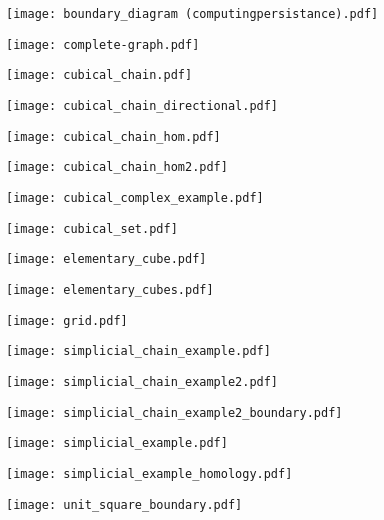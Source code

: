 \documentclass[10pt, ]{article}
\begin{document}
\begin{figure}[H]\centering\texttt{[image: boundary\_diagram (computingpersistance).pdf]}\end{figure}
\begin{figure}[H]\centering\texttt{[image: complete-graph.pdf]}\end{figure}
\begin{figure}[H]\centering\texttt{[image: cubical\_chain.pdf]}\end{figure}
\begin{figure}[H]\centering\texttt{[image: cubical\_chain\_directional.pdf]}\end{figure}
\begin{figure}[H]\centering\texttt{[image: cubical\_chain\_hom.pdf]}\end{figure}
\begin{figure}[H]\centering\texttt{[image: cubical\_chain\_hom2.pdf]}\end{figure}
\begin{figure}[H]\centering\texttt{[image: cubical\_complex\_example.pdf]}\end{figure}
\begin{figure}[H]\centering\texttt{[image: cubical\_set.pdf]}\end{figure}
\begin{figure}[H]\centering\texttt{[image: elementary\_cube.pdf]}\end{figure}
\begin{figure}[H]\centering\texttt{[image: elementary\_cubes.pdf]}\end{figure}
\begin{figure}[H]\centering\texttt{[image: grid.pdf]}\end{figure}
\begin{figure}[H]\centering\texttt{[image: simplicial\_chain\_example.pdf]}\end{figure}
\begin{figure}[H]\centering\texttt{[image: simplicial\_chain\_example2.pdf]}\end{figure}
\begin{figure}[H]\centering\texttt{[image: simplicial\_chain\_example2\_boundary.pdf]}\end{figure}
\begin{figure}[H]\centering\texttt{[image: simplicial\_example.pdf]}\end{figure}
\begin{figure}[H]\centering\texttt{[image: simplicial\_example\_homology.pdf]}\end{figure}
\begin{figure}[H]\centering\texttt{[image: unit\_square\_boundary.pdf]}\end{figure}
\end{document}
